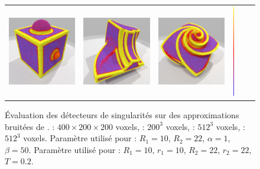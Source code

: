 \begin{figure}[ht]
\begin{center}
\begin{tabular}{l c c c cl}
      \includegraphics[width=4.0cm]{images/Feature/CubeSphere_noise_VCM_r_22} &
      \includegraphics[width=4.0cm]{images/Feature/Fandisk_noise_VCM_r_22} &
      \includegraphics[width=4.0cm]{images/Feature/OctaFlower_512_noise_VCM_r_22} &
      \includegraphics[width=0.1cm,height=4cm]{images/YMTB6W}
    \end{tabular}
    \caption[Évaluation des détecteurs de singularités sur des approximations bruitées de ]{Évaluation des détecteurs de singularités sur des approximations bruitées de .
    \SpheresUnion : $400 \times 200 \times 200$ voxels, \CubeSphere : $200^3$ voxels, \Fandisk : $512^3$ voxels, \OctaFlower : $512^3$ voxels.
    Paramètre utilisé pour : $R_1 = 10$, $R_2 = 22$, $\alpha = 1$, $\beta = 50$.
    Paramètre utilisé pour : $R_1 = 10$, $r_1 = 10$, $R_2 = 22$, $r_2 = 22$, $T = 0.2$.\label{fig:feature-comparative-noise}}
  \end{center}
\end{figure}


